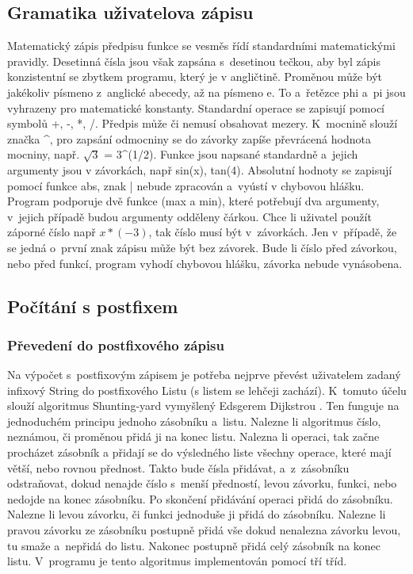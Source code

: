 \documentclass[a4paper,oneside,12p]{report}
\begin{document}
\subsection{Gramatika uživatelova zápisu}

Matematický zápis předpisu funkce se vesměs řídí standardními matematickými pravidly.
Desetinná čísla jsou však zapsána s~desetinou tečkou, aby byl zápis konzistentní se zbytkem programu, který je v angličtině.
Proměnou může být jakékoliv písmeno z~anglické abecedy, až na písmeno e.
To a~řetězce phi a~pi jsou vyhrazeny pro matematické konstanty.
Standardní operace se zapisují pomocí symbolů +, -, *, /.
Předpis může či nemusí obsahovat mezery.
K~mocnině slouží značka \string^, pro zapsání odmocniny se do závorky zapíše převrácená hodnota mocniny, např. $\sqrt{3}$ = 3\string^(1/2).
Funkce jsou napsané standardně a~jejich argumenty jsou v závorkách, např sin(x), tan(4).
Absolutní hodnoty se zapisují pomocí funkce abs, znak | nebude zpracován a~vyústí v chybovou hlášku.
Program podporuje dvě funkce (max a min), které potřebují dva argumenty, v~jejich případě budou argumenty odděleny čárkou.
Chce li uživatel použít záporné číslo např $x*(-3)$, tak číslo musí být v~závorkách.
Jen v~případě, že se jedná o~první znak zápisu může být bez závorek.
Bude li číslo před závorkou, nebo před funkcí, program vyhodí chybovou hlášku, závorka nebude vynásobena.

\subsection{Počítání s postfixem}

\subsubsection{Převedení do postfixového zápisu}

Na výpočet s~postfixovým zápisem je potřeba nejprve převést uživatelem zadaný infixový String do postfixového Listu (s listem se lehčeji zachází).
K~tomuto účelu slouží algoritmus Shunting-yard vymyšlený Edsgerem Dijkstrou \cite{EWD61}.
Ten funguje na jednoduchém principu jednoho zásobníku a~listu.
Nalezne li algoritmus číslo, neznámou, či proměnou přidá ji na konec listu.
Nalezna li operaci, tak začne procházet zásobník a přidají se do výsledného liste všechny operace, které mají větší, nebo rovnou přednost.
Takto bude čísla přidávat, a~z~zásobníku odstraňovat, dokud nenajde číslo s~menší předností, levou závorku, funkci, nebo nedojde na konec zásobníku.
Po skončení přidávání operaci přidá do zásobníku.
Nalezne li levou závorku, či funkci jednoduše ji přidá do zásobníku.
Nalezne li pravou závorku ze zásobníku postupně přidá vše dokud nenalezna závorku levou, tu smaže a~nepřidá do listu.
Nakonec postupně přidá celý zásobník na konec listu.
V~programu je tento algoritmus implementován pomocí tří tříd.
\end{document}

